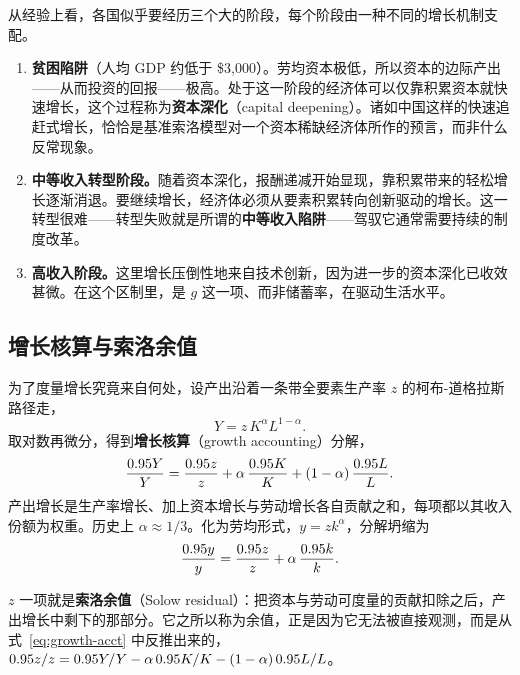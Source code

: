 从经验上看，各国似乎要经历三个大的阶段，每个阶段由一种不同的增长机制支配。

\begin{enumerate}
    \item \textbf{贫困陷阱}（人均 GDP 约低于 \$3{,}000）。劳均资本极低，所以资本的边际产出——从而投资的回报——极高。处于这一阶段的经济体可以仅靠积累资本就快速增长，这个过程称为\textbf{资本深化}（capital deepening）。诸如中国这样的快速追赶式增长，恰恰是基准索洛模型对一个资本稀缺经济体所作的预言，而非什么反常现象。
    \item \textbf{中等收入转型阶段。}随着资本深化，报酬递减开始显现，靠积累带来的轻松增长逐渐消退。要继续增长，经济体必须从要素积累转向创新驱动的增长。这一转型很难——转型失败就是所谓的\textbf{中等收入陷阱}——驾驭它通常需要持续的制度改革。
    \item \textbf{高收入阶段。}这里增长压倒性地来自技术创新，因为进一步的资本深化已收效甚微。在这个区制里，是 $g$ 这一项、而非储蓄率，在驱动生活水平。
\end{enumerate}

\subsection{增长核算与索洛余值}

为了度量增长究竟来自何处，设产出沿着一条带全要素生产率 $z$ 的柯布-道格拉斯路径走，
\[
Y = z\, K^{\alpha} L^{1-\alpha}.
\]
取对数再微分，得到\textbf{增长核算}（growth accounting）分解，
\begin{equation}
\frac{0.95 Y}{Y} = \frac{0.95 z}{z} + \alpha\,\frac{0.95 K}{K} + (1-\alpha)\,\frac{0.95 L}{L}.
\label{eq:growth-acct}
\end{equation}
产出增长是生产率增长、加上资本增长与劳动增长各自贡献之和，每项都以其收入份额为权重。历史上 $\alpha \approx 1/3$。化为劳均形式，$y = z k^{\alpha}$，分解坍缩为
\[
\frac{0.95 y}{y} = \frac{0.95 z}{z} + \alpha\,\frac{0.95 k}{k}.
\]

$z$ 一项就是\textbf{索洛余值}（Solow residual）：把资本与劳动可度量的贡献扣除之后，产出增长中剩下的那部分。它之所以称为余值，正是因为它无法被直接观测，而是从式~\eqref{eq:growth-acct} 中反推出来的，$0.95 z / z = 0.95 Y/Y - \alpha\, 0.95 K/K - (1-\alpha)\, 0.95 L/L$。


